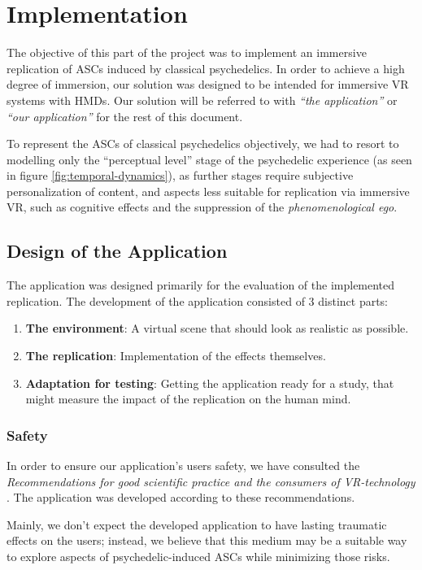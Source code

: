 \chapter{Implementation}
The objective of this part of the project was to implement an immersive replication of \acp{ASC} induced by classical psychedelics. In order to achieve a high degree of immersion, our solution was designed to be intended for immersive \ac{VR} systems with \acp{HMD}. Our solution will be referred to with \textit{``the application''} or \textit{``our application''} for the rest of this document.

To represent the \acp{ASC} of classical psychedelics objectively, we had to resort to modelling only the ``perceptual level'' stage of the psychedelic experience (as seen in figure \ref{fig:temporal-dynamics}), as further stages require subjective personalization of content, and aspects less suitable for replication via immersive \ac{VR}, such as cognitive effects and the suppression of the \textit{phenomenological ego}.

\section{Design of the Application}
The application was designed primarily for the evaluation of the implemented replication. The development of the application consisted of 3 distinct parts:

\begin{enumerate}
    \item \textbf{The environment}: A virtual scene that should look as realistic as possible.
    \item \textbf{The replication}: Implementation of the effects themselves.
    \item \textbf{Adaptation for testing}: Getting the application ready for a study, that might measure the impact of the replication on the human mind.
\end{enumerate}

\subsection{Safety}
In order to ensure our application's users safety, we have consulted the \textit{Recommendations for good scientific practice and the consumers of VR-technology} \autocite{madary2016real}. The application was developed according to these recommendations.

Mainly, we don't expect the developed application to have lasting traumatic effects on the users; instead, we believe that this medium may be a suitable way to explore aspects of psychedelic-induced \acp{ASC} while minimizing those risks.


